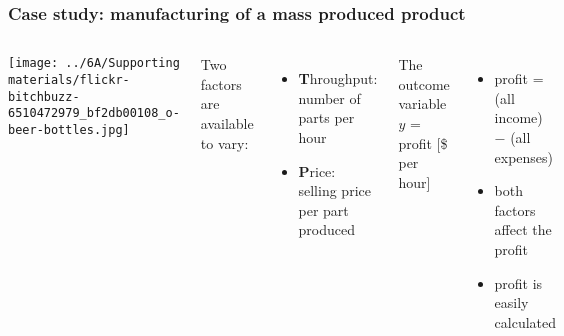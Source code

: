 \begin{frame}\frametitle{Case study: manufacturing of a mass produced product}
	\begin{columns}[c]
				\centerline{\texttt{[image: ../6A/Supporting materials/flickr-bitchbuzz-6510472979\_bf2db00108\_o-beer-bottles.jpg]}}
			Two factors are available to vary:
			\begin{itemize}
				

				\item	\textbf{T}hroughput: number of parts per hour
				\item	\textbf{P}rice: selling price per part produced
			\end{itemize}
			
			\vspace{1cm}
			\pause
			The outcome variable $y$ = profit [\$ per hour]
			
			\begin{itemize}
				\item	profit = (all income) $-$ (all expenses) \pause
				\item	both factors affect the profit \pause
				\item	profit is easily calculated \pause
			\end{itemize}
	\end{columns}
\end{frame}

